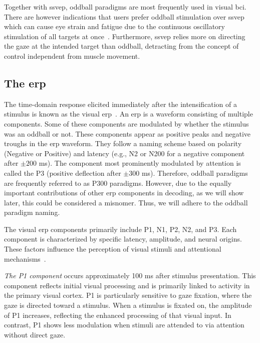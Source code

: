 Together with \ac{ssvep}, oddball paradigms are most frequently used in visual
\ac{bci}.
There are however indications that users prefer oddball stimulation over
\ac{ssvep} which can cause eye strain and fatigue due to the continuous
oscillatory stimulation of all targets at once~\cite{Xu2021}.
Furthermore, \ac{ssvep} relies more on directing the gaze at the intended
target than oddball, detracting from the concept of control independent from
muscle movement.



\subsection{The \acf{erp}}
\label{sec:bci/oddball/erp}

The time-domain response elicited immediately after the intensification of a
stimulus is known as the visual \ac{erp}~\cite{Luck2014}.
An \ac{erp} is a waveform consisting of multiple components.
Some of these components are modulated by whether the stimulus was an
oddball or not.
These components appear as positive peaks and negative troughs in the \ac{erp}
waveform.
They follow a naming scheme based on polarity (Negative or Positive) and
latency (e.g., N2 or N200 for a negative component after $\pm200$ ms).
The component most prominently modulated by attention is called the P3
(positive deflection after $\pm300$ ms).
Therefore, oddball paradigms are frequently referred to as P300 paradigms.
However, due to the equally important contributions of other \ac{erp}
components in decoding, as we will show later, this could be considered a
misnomer.
Thus, we will adhere to the oddball paradigm naming.

The visual \ac{erp} components primarily include P1, N1, P2, N2, and P3.
Each component is characterized by specific latency, amplitude, and neural
origins.
These factors influence the perception of visual stimuli and attentional
mechanisms~\cite{Luck2013}.

\emph{The P1 component} occurs approximately 100 ms after stimulus presentation.
This component reflects initial visual processing and is primarily linked to
activity in the primary visual cortex.
P1 is particularly sensitive to gaze fixation, where the gaze is directed
toward a stimulus.
When a stimulus is fixated on, the amplitude of P1 increases, reflecting the
enhanced processing of that visual input.
In contrast, P1 shows less modulation when stimuli are attended to via
attention without direct gaze.

